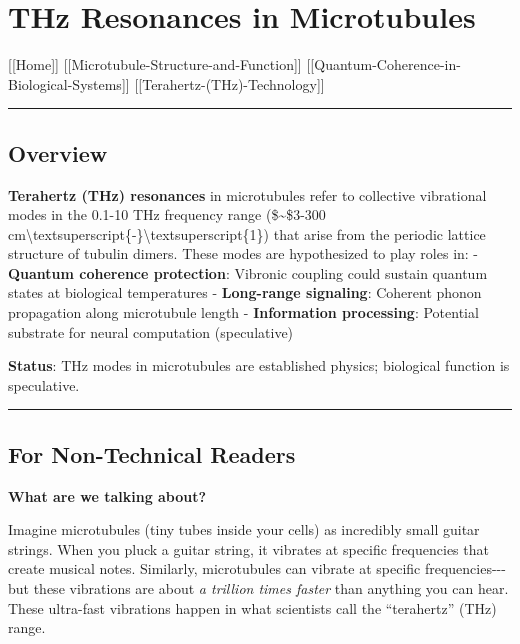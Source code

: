 \section{THz Resonances in
Microtubules}\label{thz-resonances-in-microtubules}

{[}{[}Home{]}{]} \textbar{}
{[}{[}Microtubule-Structure-and-Function{]}{]} \textbar{}
{[}{[}Quantum-Coherence-in-Biological-Systems{]}{]} \textbar{}
{[}{[}Terahertz-(THz)-Technology{]}{]}

\begin{center}\rule{0.5\linewidth}{0.5pt}\end{center}

\subsection{Overview}\label{overview}

\textbf{Terahertz (THz) resonances} in microtubules refer to collective
vibrational modes in the 0.1-10 THz frequency range (\$\sim\$3-300
cm\textbackslash textsuperscript\{-\}\textbackslash textsuperscript\{1\})
that arise from the periodic lattice structure of tubulin dimers. These
modes are hypothesized to play roles in: - \textbf{Quantum coherence
protection}: Vibronic coupling could sustain quantum states at
biological temperatures - \textbf{Long-range signaling}: Coherent phonon
propagation along microtubule length - \textbf{Information processing}:
Potential substrate for neural computation (speculative)

\textbf{Status}: THz modes in microtubules are established physics;
biological function is speculative.

\begin{center}\rule{0.5\linewidth}{0.5pt}\end{center}

\subsection{\texorpdfstring{ For Non-Technical
Readers}{ For Non-Technical Readers}}\label{for-non-technical-readers}

\textbf{What are we talking about?}

Imagine microtubules (tiny tubes inside your cells) as incredibly small
guitar strings. When you pluck a guitar string, it vibrates at specific
frequencies that create musical notes. Similarly, microtubules can
vibrate at specific frequencies-\/-\/-but these vibrations are about
\emph{a trillion times faster} than anything you can hear. These
ultra-fast vibrations happen in what scientists call the ``terahertz''
(THz) range.

